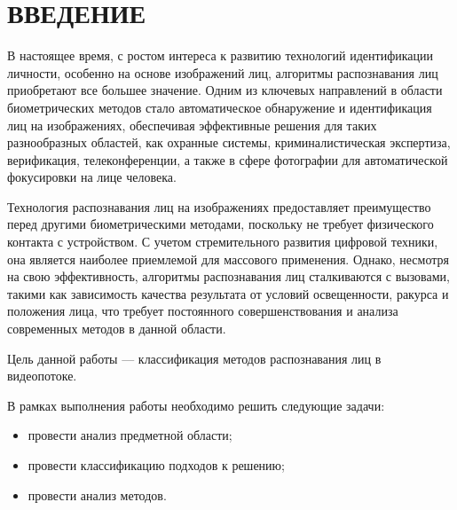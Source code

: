 \chapter*{ВВЕДЕНИЕ}

В настоящее время, с ростом интереса к развитию технологий идентификации 
личности, особенно на основе изображений лиц, алгоритмы распознавания лиц 
приобретают все большее значение. Одним из ключевых направлений в области 
биометрических методов стало автоматическое обнаружение и идентификация 
лиц на изображениях, обеспечивая эффективные решения для таких 
разнообразных областей, как охранные системы, криминалистическая 
экспертиза, верификация, телеконференции, а также в сфере фотографии для 
автоматической фокусировки на лице человека.

Технология распознавания лиц на изображениях предоставляет преимущество 
перед другими биометрическими методами, поскольку не требует физического 
контакта с устройством. С учетом стремительного развития цифровой техники, 
она является наиболее приемлемой для массового применения. Однако, 
несмотря на свою эффективность, алгоритмы распознавания лиц сталкиваются 
с вызовами, такими как зависимость качества результата от условий 
освещенности, ракурса и положения лица, что требует постоянного 
совершенствования и анализа современных методов в данной области.

Цель данной работы --- классификация методов распознавания лиц в 
видеопотоке.

В рамках выполнения работы необходимо решить следующие задачи:

\begin{itemize}[label=---]
  \item провести анализ предметной области;
  \item провести классификацию подходов к решению;
  \item провести анализ методов.
\end{itemize}


